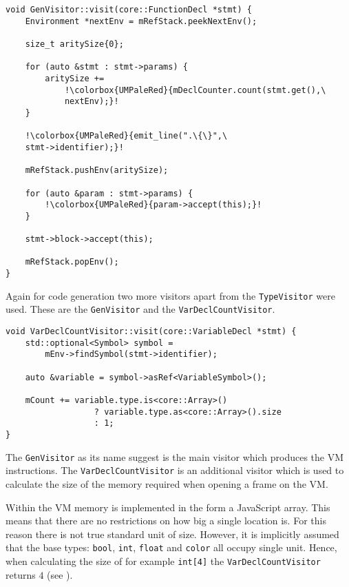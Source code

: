 \begin{lstlisting}[escapechar=!, caption={The
\texttt{visit(FunctionDecl *)} method in the \texttt{GenVisitor}
class (ir\_gen/GenVisitor.cpp)}, label=lst:genfuncdecl]
void GenVisitor::visit(core::FunctionDecl *stmt) {
    Environment *nextEnv = mRefStack.peekNextEnv();

    size_t aritySize{0};

    for (auto &stmt : stmt->params) {
        aritySize +=
            !\colorbox{UMPaleRed}{mDeclCounter.count(stmt.get(),\
            nextEnv);}!
    }

    !\colorbox{UMPaleRed}{emit_line(".\{\}",\
    stmt->identifier);}!

    mRefStack.pushEnv(aritySize);

    for (auto &param : stmt->params) {
        !\colorbox{UMPaleRed}{param->accept(this);}!
    }

    stmt->block->accept(this);

    mRefStack.popEnv();
}
\end{lstlisting}

Again for code generation two more visitors apart from the
\texttt{TypeVisitor} were used. These are the
\texttt{GenVisitor} and the \texttt{VarDeclCountVisitor}.

\begin{lstlisting}[caption={The \texttt{visit(VariableDecl *)}
method in the \texttt{VarDeclCountVisitor} class
(ir\_gen/VarDeclCountVisitor.cpp)}, label=lst:vardeclcount]
void VarDeclCountVisitor::visit(core::VariableDecl *stmt) {
    std::optional<Symbol> symbol =
        mEnv->findSymbol(stmt->identifier);

    auto &variable = symbol->asRef<VariableSymbol>();

    mCount += variable.type.is<core::Array>()
                  ? variable.type.as<core::Array>().size
                  : 1;
}
\end{lstlisting}

The \texttt{GenVisitor} as its name suggest is the main visitor
which produces the VM instructions. The
\texttt{VarDeclCountVisitor} is an additional visitor which is
used to calculate the size of the memory required when opening a
frame on the VM.

\begin{note}
Within the VM memory is implemented in the form a JavaScript
array. This means that there are no restrictions on how big a
single location is. For this reason there is not true standard
unit of size. However, it is implicitly assumed that the base
types: \texttt{bool}, \texttt{int}, \texttt{float} and
\texttt{color} all occupy single unit. Hence, when calculating
the size of for example \texttt{int[4]} the
\texttt{VarDeclCountVisitor} returns $4$ (see
\listref{vardeclcount}).
\end{note}


